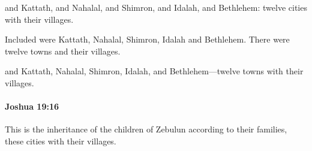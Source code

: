 			\begin{versebox}
					\item[BHS] 
					\item[ASV] and Kattath, and Nahalal, and Shimron, and Idalah, and Bethlehem: twelve cities with their villages.
					\item[NIV] Included were Kattath, Nahalal, Shimron, Idalah and Bethlehem. There were twelve towns and their villages.
					\item[NRSV] and Kattath, Nahalal, Shimron, Idalah, and Bethlehem—twelve towns with their villages.
			\end{versebox}

		\paragraph{Joshua 19:16} %
			\label{JOSHUA-19-16}

			This is the inheritance of the children of Zebulun according to their families, these cities with their villages.

